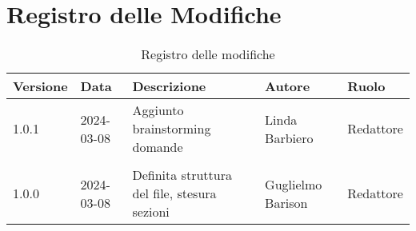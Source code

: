 \section{Registro delle Modifiche}
\begin{table}[ht!]	
		\centering
		\begin{tabular}{ p{1.2cm} p{2cm} p{6cm} p{3cm} p{2cm}}
			\toprule
			\textbf{Versione}& \textbf{Data} & \textbf{Descrizione} & \textbf{Autore} & \textbf{Ruolo} \\
			\midrule
			1.0.1 & 2024-03-08 & Aggiunto brainstorming domande & Linda Barbiero &
			Redattore \\\\ %
			1.0.0 & 2024-03-08 & Definita struttura del file, stesura sezioni & Guglielmo Barison & Redattore \\
			\bottomrule
		\end{tabular}
		\caption{Registro delle modifiche}
		\label{table:Registro delle modifiche}
\end{table}
